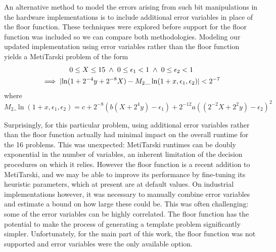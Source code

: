 \documentclass[a4]{article}
\newcommand{\abs}[1]{\lvert#1\rvert}
\begin{document}
\noindent An alternative method to model the errors arising from such bit manipulations in the hardware implementations is to include additional error variables in place of the floor function. These techniques were explored before support for the floor function was included so we can compare both methodologies. Modeling our updated implementation using error variables rather than the floor function yields a MetiTarski problem of the form
\begin{multline*}
	0\le X \le 15 \hspace{0.1cm} \land \hspace{0.1cm} 0\le \epsilon_1<1\hspace{0.1cm} \land \hspace{0.1cm} 0\le \epsilon_2<1\\
	\implies \abs{\ln(1+2^{-4}y+2^{-8}X) - M_2\_\ln(1+x,\epsilon_1,\epsilon_2)} < 2^{-7}
\end{multline*}
where
$$M_2\_\ln(1+x,\epsilon_1,\epsilon_2)=c+2^{-8}(b(X+2^{4}y)-\epsilon_1)+2^{-12}a((2^{-2}X+2^{2}y)-\epsilon_2)^2$$

Surprisingly, for this particular problem, using additional error variables rather than the floor function actually had minimal impact on the overall runtime for the 16 problems. This was unexpected: MetiTarski runtimes can be doubly exponential in the number of variables, an inherent limitation of the decision procedures on which it relies. However the floor function is a recent addition to MetiTarski, and we may be able to improve its performance by fine-tuning its heuristic parameters, which at present are at default values. On industrial implementations however, it was necessary to manually combine error variables and estimate a bound on how large these could be. This was often challenging: some of the error variables can be highly correlated. The floor function has the potential to make the process of generating a template problem significantly simpler. Unfortunately, for the main part of this work, the floor function was not supported and error variables were the only available option.
\end{document}
